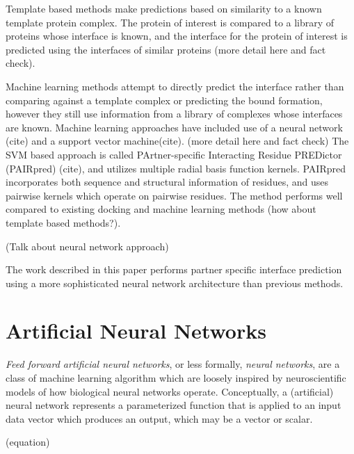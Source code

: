 Template based methods make predictions based on similarity to a known template protein complex. 
The protein of interest is compared to a library of proteins whose interface is known, and the interface for the protein of interest is predicted using the interfaces of similar proteins (more detail here and fact check).

Machine learning methods attempt to directly predict the interface rather than comparing against a template complex or predicting the bound formation, however they still use information from a library of complexes whose interfaces are known.
Machine learning approaches have included use of a neural network (cite) and a support vector machine(cite). (more detail here and fact check)
The SVM based approach is called PArtner-specific Interacting Residue PREDictor (PAIRpred) (cite), and utilizes multiple radial basis function kernels. 
PAIRpred incorporates both sequence and structural information of residues, and uses pairwise kernels which operate on pairwise residues.
The method performs well compared to existing docking and machine learning methods (how about template based methods?).

(Talk about neural network approach)


The work described in this paper performs partner specific interface prediction using a more sophisticated neural network architecture than previous methods. 


\section{Artificial Neural Networks}

\textit{Feed forward artificial neural networks}, or less formally, \textit{neural networks}, are a class of machine learning algorithm which are loosely inspired by neuroscientific models of how biological neural networks operate. 
Conceptually, a (artificial) neural network represents a parameterized function that is applied to an input data vector which produces an output, which may be a vector or scalar. 

(equation)

